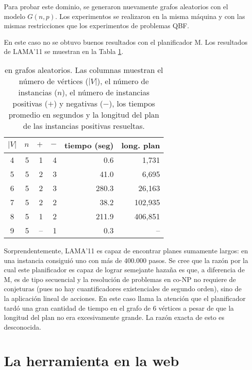 Para probar este dominio, se generaron nuevamente grafos aleatorios con el modelo
$G(n,p)$. Los experimentos se realizaron en la misma máquina y con las
mismas restricciones que los experimentos de problemas QBF.

En este caso no se obtuvo buenos resultados con el planificador M.
Los resultados de LAMA'11 \citep{richter:lama} se muestran en la
Tabla \ref{table:exp:co-3col}.

\begin{table}[h!]
\centering
\begin{tabular}{crrrrr}
$|V|$ & $n$ & $+$ & $-$ &  tiempo (seg) & long. plan  \\
\midrule
    4 &   5 &   1 &   4 &   0.6 &   1,731  \\
    5 &   5 &   2 &   3 &  41.0 &   6,695  \\
    6 &   5 &   2 &   3 & 280.3 &  26,163  \\
    7 &   5 &   2 &   2 &  38.2 & 102,935  \\
    8 &   5 &   1 &   2 & 211.9 & 406,851  \\
    9 &   5 & -- &   1 &   0.3 &      -- \\
\end{tabular}
\caption[Resultados de LAMA'11 para \coCOL]{\small \coCOL en grafos aleatorios.
  Las columnas muestran el número de vértices ($|V|$), el número de instancias ($n$),
  el número de instancias positivas ($+$) y negativas ($-$), los tiempos
  promedio en segundos y la longitud del plan de las instancias positivas
  resueltas.
}
\label{table:exp:co-3col}
\end{table}

Sorprendentemente, LAMA'11 es capaz de encontrar planes sumamente largos: en
una instancia consiguió uno con más de 400.000 pasos. Se cree que la razón
por la cual este planificador es capaz de lograr semejante hazaña es que, a diferencia de M, 
es de tipo secuencial y la resolución de problemas en co-NP no requiere de
conjeturas (pues no hay cuantificadores existenciales de segundo orden), sino
de la aplicación lineal de acciones. En este caso llama la atención que el
planificador tardó una gran cantidad de tiempo en el grafo de 6 vértices a
pesar de que la longitud del plan no era excesivamente grande. La razón exacta
de esto es desconocida.

\section{La herramienta en la web}

